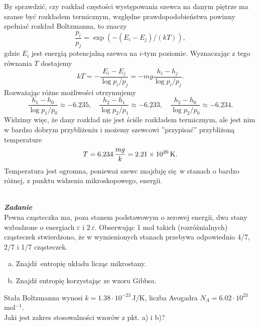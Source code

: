 \documentclass[11pt,a4paper]{article}
\newcounter{zadanie}\newcommand{\zadanie}[1][]{\addtocounter{zadanie}{1} ~\\  {\bf \emph{Zadanie \arabic{zadanie} #1 }} \\}
\begin{document}
By sprawdzić, czy rozkład częstości występowania szewca na danym piętrze ma szanse być rozkładem termicznym, względne prawdopodobieństwa powinny spełniać rozkład Boltzmanna, to znaczy
\begin{equation}
	\frac{p_i}{p_j} = \exp\left( - (E_i - E_j)/ (k T)\right),
\end{equation}
gdzie $E_i$ jest energią potencjalną szewca na $i$-tym poziomie. Wyznaczając z tego równania $T$ dostajemy
\begin{equation}
	kT = - \frac{E_i - E_j}{\log p_i / p_j} = - mg \frac{h_i - h_j}{\log p_i/p_j}.
\end{equation}
Rozważając różne możliwości otrzymujemy
\begin{equation}
	\frac{h_1- h_0}{\log p_1/p_0} \approx - 6.235, \quad \frac{h_2- h_1}{\log p_2/p_1} \approx -6.233, \quad \frac{h_2- h_0}{\log p_2/p_0} \approx -6.234.
\end{equation}
Widzimy więc, że dany rozkład nie jest ściśle rozkładem termicznym, ale jest nim w bardzo dobrym przybliżeniu i możemy szewcowi ''przypisać'' przybliżoną temperature
\begin{equation}
	T = 6.234\, \frac{m g}{k} = 2.21 \times 10^{26}\,{\rm K}.
\end{equation}
Temperatura jest ogromna, ponieważ szewc znajduję się w stanach o bardzo różnej, z punktu widzenia mikroskopowego, energii.

\newpage


\zadanie
Pewna cząsteczka ma, poza stanem podstawowym o zerowej energii, dwa stany wzbudzone o energiach $\varepsilon$ i $2\,\varepsilon$.
Obserwując 1 mol takich (rozróżnialnych) cząsteczek stwierdzono, że w wymienionych stanach przebywa odpowiednio 4/7, 2/7 i 1/7 cząsteczek.
\begin{enumerate}[a)]
\item Znajdź entropię układu licząc mikrostany. 
\item Znajdź entropię korzystając ze wzoru Gibbsa.
\end{enumerate}
Stała Boltzmanna wynosi $k = 1.38\cdot 10^{-23}\,$J/K, 
liczba Avogadra $N_A=6.02\cdot 10^{23}$\, mol$^{-1}$. \\
Jaki jest zakres stosowalności wzorów z pkt. a) i b)?
\end{document}
